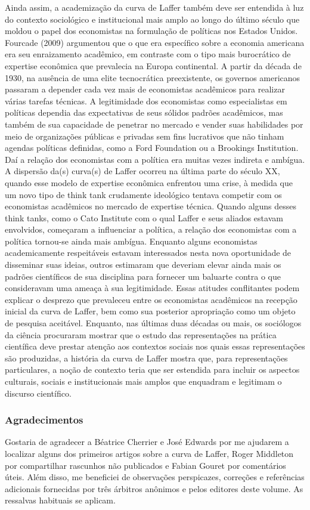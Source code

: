 \documentclass[a4paper,12pt]{article}[abntex2]
\begin{document}
Ainda assim, a academização da curva de Laffer também deve ser entendida à luz do contexto sociológico e institucional mais amplo ao longo do último século que moldou o papel dos economistas na formulação de políticas nos Estados Unidos. Fourcade (2009) argumentou que o que era específico sobre a economia americana era seu enraizamento acadêmico, em contraste com o tipo mais burocrático de expertise econômica que prevalecia na Europa continental. A partir da década de 1930, na ausência de uma elite tecnocrática preexistente, os governos americanos passaram a depender cada vez mais de economistas acadêmicos para realizar várias tarefas técnicas. A legitimidade dos economistas como especialistas em políticas dependia das expectativas de seus sólidos padrões acadêmicos, mas também de sua capacidade de penetrar no mercado e vender suas habilidades por meio de organizações públicas e privadas sem fins lucrativos que não tinham agendas políticas definidas, como a Ford Foundation ou a Brookings Institution. Daí a relação dos economistas com a política era muitas vezes indireta e ambígua. A dispersão da(s) curva(s) de Laffer ocorreu na última parte do século XX, quando esse modelo de expertise econômica enfrentou uma crise, à medida que um novo tipo de think tank crudamente ideológico tentava competir com os economistas acadêmicos no mercado de expertise técnica. Quando alguns desses think tanks, como o Cato Institute com o qual Laffer e seus aliados estavam envolvidos, começaram a influenciar a política, a relação dos economistas com a política tornou-se ainda mais ambígua. Enquanto alguns economistas academicamente respeitáveis estavam interessados nesta nova oportunidade de disseminar suas ideias, outros estimaram que deveriam elevar ainda mais os padrões científicos de sua disciplina para fornecer um baluarte contra o que consideravam uma ameaça à sua legitimidade. Essas atitudes conflitantes podem explicar o desprezo que prevaleceu entre os economistas acadêmicos na recepção inicial da curva de Laffer, bem como sua posterior apropriação como um objeto de pesquisa aceitável. Enquanto, nas últimas duas décadas ou mais, os sociólogos da ciência procuraram mostrar que o estudo das representações na prática científica deve prestar atenção aos contextos sociais nos quais essas representações são produzidas, a história da curva de Laffer mostra que, para representações particulares, a noção de contexto teria que ser estendida para incluir os aspectos culturais, sociais e institucionais mais amplos que enquadram e legitimam o discurso científico.

\subsubsection{\textbf{Agradecimentos}}

Gostaria de agradecer a Béatrice Cherrier e José Edwards por me ajudarem a localizar alguns dos primeiros artigos sobre a curva de Laffer, Roger Middleton por compartilhar rascunhos não publicados e Fabian Gouret por comentários úteis. Além disso, me beneficiei de observações perspicazes, correções e referências adicionais fornecidas por três árbitros anônimos e pelos editores deste volume. As ressalvas habituais se aplicam.
\end{document}
